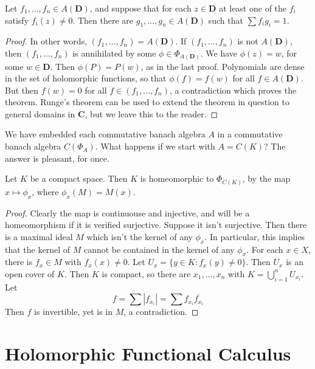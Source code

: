 \begin{lemma}
    Let $f_1, \dots, f_n \in A(\mathbf{D})$, and suppose that for each $z \in \mathbf{D}$ at least one of the $f_i$ satisfy $f_i(z) \neq 0$. Then there are $g_1, \dots, g_n \in A(\mathbf{D})$ such that $\sum f_i g_i = 1$.
\end{lemma}
\begin{proof}
    In other words, $(f_1, \dots, f_n) = A(\mathbf{D})$. If $(f_1, \dots, f_n)$ is not $A(\mathbf{D})$, then $(f_1, \dots, f_n)$ is annihilated by some $\phi \in \Phi_{A(\mathbf{D})}$. We have $\phi(z) = w$, for some $w \in \mathbf{D}$. Then $\phi(P) = P(w)$, as in the last proof. Polynomials are dense in the set of holomorphic functions, so that $\phi(f) = f(w)$ for all $f \in A(\mathbf{D})$. But then $f(w) = 0$ for all $f \in (f_1, \dots, f_n)$, a contradiction which proves the theorem. Runge's theorem can be used to extend the theorem in question to general domains in $\mathbf{C}$, but we leave this to the reader.
\end{proof}

We have embedded each commutative banach algebra $A$ in a commutative banach algebra $C(\Phi_A)$. What happens if we start with $A = C(K)$? The answer is pleasant, for once.

\begin{theorem}
    Let $K$ be a compact space. Then $K$ is homeomorphic to $\Phi_{C(K)}$, by the map $x \mapsto \phi_x$, where $\phi_x(M) = M(x)$.
\end{theorem}
\begin{proof}
    Clearly the map is continuouse and injective, and will be a homeomorphism if it is verified surjective. Suppose it isn't surjective. Then there is a maximal ideal $M$ which isn't the kernel of any $\phi_x$. In particular, this implies that the kernel of $M$ cannot be contained in the kernel of any $\phi_x$. For each $x \in X$, there is $f_x \in M$ with $f_x(x) \neq 0$. Let $U_x = \{ y \in K : f_x(y) \neq 0 \}$. Then $U_x$ is an open cover of $K$. Then $K$ is compact, so there are $x_1, \dots, x_n$ with $K = \bigcup_{i = 1}^n U_{x_i}$. Let
    \[ f = \sum |f_{x_i}| = \sum f_{x_i} \overline{f_{x_i}} \]
    Then $f$ is invertible, yet is in $M$, a contradiction.
\end{proof}



\section{Holomorphic Functional Calculus}

